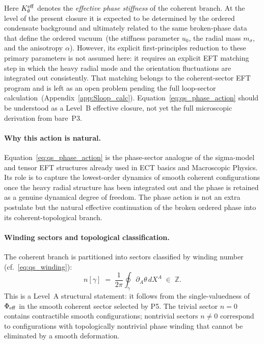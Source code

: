 Here $K_\theta^{\rm eff}$ denotes the \emph{effective phase stiffness}
of the coherent branch.
At the level of the present closure it is expected to be determined by
the ordered condensate background and ultimately related to the same
broken-phase data that define the ordered vacuum~(the stiffness
parameter $u_0$, the radial mass $m_\sigma$, and the anisotropy
$\alpha$).
However, its explicit first-principles reduction to these primary
parameters is not assumed here: it requires an explicit EFT matching
step in which the heavy radial mode and the orientation fluctuations are
integrated out consistently.
That matching belongs to the coherent-sector EFT program and is
left as an open problem pending the full loop-sector
calculation~(Appendix~\ref{app:Sloop_calc}).
Equation~\eqref{eq:qs_phase_action} should be understood as a
Level~B effective closure, not yet the full microscopic derivation
from bare~P3.

\paragraph{Why this action is natural.}
Equation~\eqref{eq:qs_phase_action} is the phase-sector analogue of
the sigma-model and tensor EFT structures already used in ECT basics
and Macroscopic Physics.
Its role is to capture the lowest-order dynamics of smooth coherent
configurations once the heavy radial structure has been integrated out
and the phase is retained as a genuine dynamical degree of freedom.
The phase action is not an extra postulate but the natural effective
continuation of the broken ordered phase into its coherent-topological
branch.

\paragraph{Winding sectors and topological classification.}
The coherent branch is partitioned into sectors classified by winding
number (cf.~\eqref{eq:qs_winding}):
\begin{equation}
  \label{eq:qs_winding_sector}
  n[\gamma] \;=\; \frac{1}{2\pi}
  \oint_\gamma \partial_A\theta\,dX^A \;\in\; \mathbb{Z}.
\end{equation}
This is a Level~A structural statement: it follows from the
single-valuedness of $\Phi_{\rm eff}$ in the smooth coherent sector
selected by P5.
The trivial sector $n=0$ contains contractible smooth configurations;
nontrivial sectors $n\neq0$ correspond to configurations with
topologically nontrivial phase winding that cannot be eliminated by
a smooth deformation.

